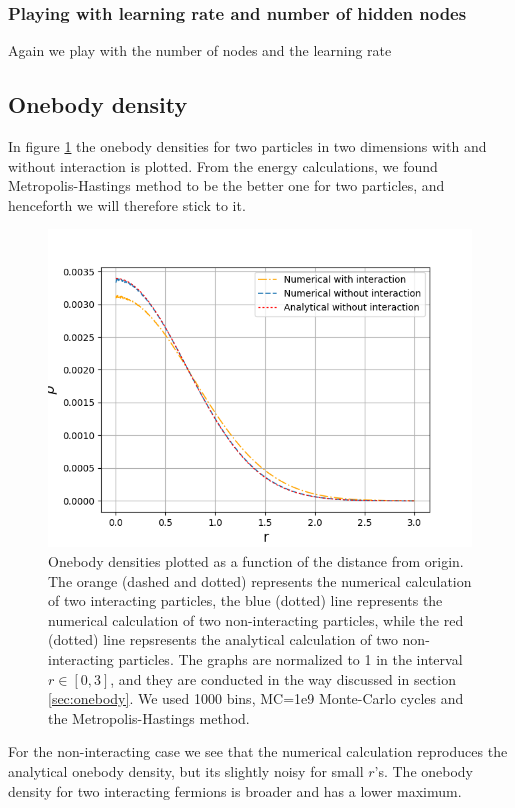 \documentclass[norsk,a4paper,12pt]{article}
\begin{document}
\subsubsection{Playing with learning rate and number of hidden nodes}
Again we play with the number of nodes and the learning rate

\subsection{Onebody density}
In figure \ref{fig:OB} the onebody densities for two particles in two dimensions with and without interaction is plotted. From the energy calculations, we found Metropolis-Hastings method to be the better one for two particles, and henceforth we will therefore stick to it. 
 \begin{figure} [H]
 	\centering
 	\includegraphics[scale=0.8]{plots/OB_comparison_MC_1e9.png}
 	\caption{Onebody densities plotted as a function of the distance from origin. The orange (dashed and dotted) represents the numerical calculation of two interacting particles, the blue (dotted) line represents the numerical calculation of two non-interacting particles, while the red (dotted) line repsresents the analytical calculation of two non-interacting particles. The graphs are normalized to 1 in the interval $r\in[0,3]$, and they are conducted in the way discussed in section \ref{sec:onebody}. We used 1000 bins, MC=1e9 Monte-Carlo cycles and the Metropolis-Hastings method.}
 	\label{fig:OB}
 \end{figure}
For the non-interacting case we see that the numerical calculation reproduces the analytical onebody density, but its slightly noisy for small $r$'s. The onebody density for two interacting fermions is broader and has a lower maximum.
 
\end{document}
